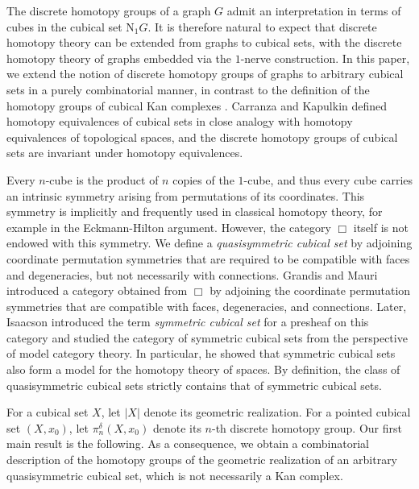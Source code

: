 \documentclass[oneside, 12pt]{amsart}
\numberwithin{equation}{section}
\theoremstyle{plain}
\theoremstyle{definition}
\theoremstyle{remark}
\begin{document}
	
	
	The discrete homotopy groups of a graph $G$ admit an interpretation in terms of cubes in the cubical set $\mathrm{N}_1G$. It is therefore natural to expect that discrete homotopy theory can be extended from graphs to cubical sets, with the discrete homotopy theory of graphs embedded via the $1$-nerve construction. In this paper, we extend the notion of discrete homotopy groups of graphs to arbitrary cubical sets in a purely combinatorial manner, in contrast to the definition of the homotopy groups of cubical Kan complexes \cite{CK1}. Carranza and Kapulkin \cite{CK1} defined homotopy equivalences of cubical sets in close analogy with homotopy equivalences of topological spaces, and the discrete homotopy groups of cubical sets are invariant under homotopy equivalences.
	
	
	
	Every $n$-cube is the product of $n$ copies of the $1$-cube, and thus every cube carries an intrinsic symmetry arising from permutations of its coordinates. This symmetry is implicitly and frequently used in classical homotopy theory, for example in the Eckmann-Hilton argument. However, the category $\Box$ itself is not endowed with this symmetry. We define a \emph{quasisymmetric cubical set} by adjoining coordinate permutation symmetries that are required to be compatible with faces and degeneracies, but not necessarily with connections. Grandis and Mauri \cite{GM1} introduced a category obtained from $\Box$ by adjoining the coordinate permutation symmetries that are compatible with faces, degeneracies, and connections. Later, Isaacson \cite{I} introduced the term \emph{symmetric cubical set} for a presheaf on this category and studied the category of symmetric cubical sets from the perspective of model category theory. In particular, he showed that symmetric cubical sets also form a model for the homotopy theory of spaces. By definition, the class of quasisymmetric cubical sets strictly contains that of symmetric cubical sets.
	
	
	
	For a cubical set $X$, let $|X|$ denote its geometric realization. For a pointed cubical set $(X,x_0)$, let $\pi_n^\delta(X,x_0)$ denote its $n$-th discrete homotopy group. Our first main result is the following. As a consequence, we obtain a combinatorial description of the homotopy groups of the geometric realization of an arbitrary quasisymmetric cubical set, which is not necessarily a Kan complex.
	
	
	
\end{document}
